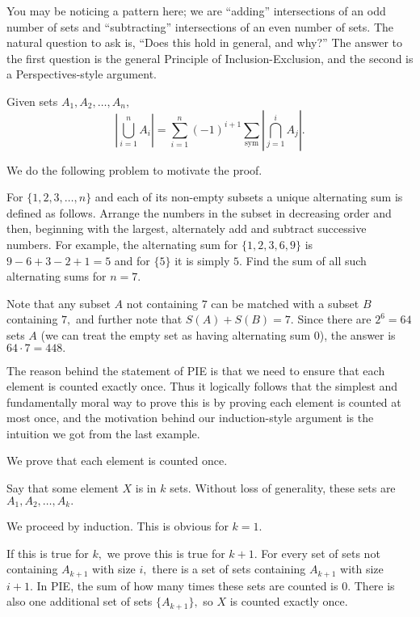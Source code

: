 \documentclass[blue,onecol]{shooting}
\begin{document}
You may be noticing a pattern here; we are ``adding'' intersections of an odd number of sets and ``subtracting'' intersections of an even number of sets. The natural question to ask is, ``Does this hold in general, and why?'' The answer to the first question is the general Principle of Inclusion-Exclusion, and the second is a Perspectives-style argument.
\begin{theo}
Given sets $A_1,A_2,\dots,A_n,$
$$|\bigcup_{i=1}^n A_i|=\sum\limits_{i=1}^{n} (-1)^{i+1}\sum\limits_{\text{sym}}|\bigcap_{j=1}^{i} A_j|.$$
\end{theo}

We do the following problem to motivate the proof.

\begin{exam}[AIME 1983/13]
For $\{1, 2, 3, \ldots, n\}$ and each of its non-empty subsets a unique alternating sum is defined as follows. Arrange the numbers in the subset in decreasing order and then, beginning with the largest, alternately add and subtract successive numbers. For example, the alternating sum for $\{1, 2, 3, 6,9\}$ is $9-6+3-2+1=5$ and for $\{5\}$ it is simply $5$. Find the sum of all such alternating sums for $n=7$. 
\end{exam}

\begin{sol}
Note that any subset $A$ not containing $7$ can be matched with a subset $B$ containing $7,$ and further note that $S(A)+S(B)=7.$ Since there are $2^6=64$ sets $A$ (we can treat the empty set as having alternating sum $0$), the answer is $64\cdot 7=448.$
\end{sol}

The reason behind the statement of PIE is that we need to ensure that each element is counted exactly once. Thus it logically follows that the simplest and fundamentally moral way to prove this is by proving each element is counted at most once, and the motivation behind our induction-style argument is the intuition we got from the last example.

\begin{pro}
We prove that each element is counted once.

Say that some element $X$ is in $k$ sets. Without loss of generality, these sets are $A_1,A_2,\dots,A_k.$

We proceed by induction. This is obvious for $k=1.$

If this is true for $k,$ we prove this is true for $k+1.$ For every set of sets not containing $A_{k+1}$ with size $i,$ there is a set of sets containing $A_{k+1}$ with size $i+1.$ In PIE, the sum of how many times these sets are counted is $0.$ There is also one additional set of sets $\{A_{k+1}\},$ so $X$ is counted exactly once.
\end{pro}
\end{document}
